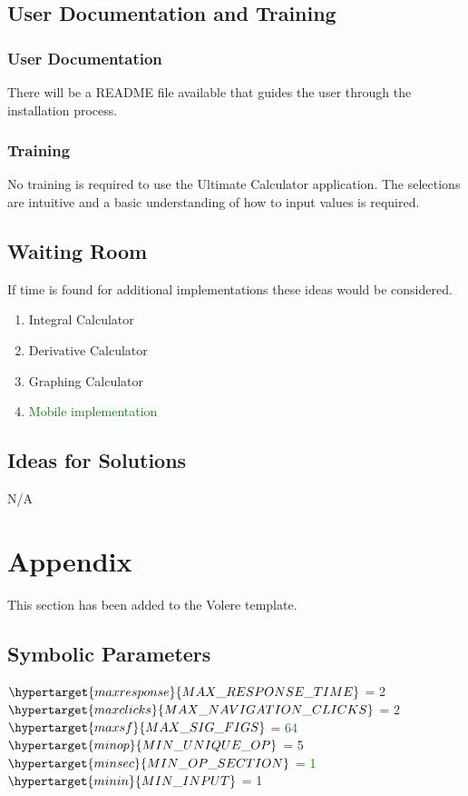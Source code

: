 \documentclass[12pt, titlepage]{article}
\begin{document}
\subsection{User Documentation and Training}
\subsubsection{User Documentation}
There will be a README file available that guides the user through the installation process.
\subsubsection{Training}
No training is required to use the Ultimate Calculator application. The selections are intuitive and a basic understanding of how to input values is required.
\subsection{Waiting Room}
If time is found for additional implementations these ideas would be considered.
\begin{enumerate}
    \item Integral Calculator
    \item Derivative Calculator
    \item Graphing Calculator
    \item \textcolor{Green}{Mobile implementation}
\end{enumerate}
\subsection{Ideas for Solutions}
N/A




\newpage

\section{Appendix}

This section has been added to the Volere template.

\subsection{Symbolic Parameters}
$\hypertarget{maxresponse}{MAX\_RESPONSE\_TIME}$ = 2\\
$\hypertarget{maxclicks}{MAX\_NAVIGATION\_CLICKS}$ = 2\\
$\hypertarget{maxsf}{MAX\_SIG\_FIGS}$ = \textcolor{Green}{64}\\
$\hypertarget{minop}{MIN\_UNIQUE\_OP}$ = 5\\
$\hypertarget{minsec}{MIN\_OP\_SECTION}$ = \textcolor{Green}{1}\\
$\hypertarget{minin}{MIN\_INPUT}$ = 1\\
\end{document}
